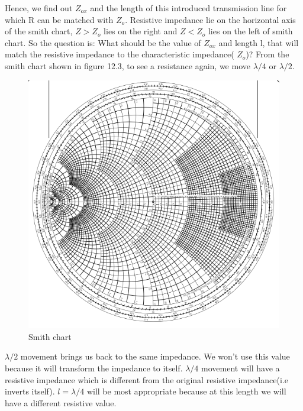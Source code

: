 Hence, we find out $ Z_{ox}$ and the length of this introduced transmission line for which R can be matched with $ Z_o$. Resistive impedance lie on the horizontal axis of the smith chart, $Z >  Z_o$ lies on the right and $Z <  Z_o$ lies on the left of smith chart.
So the question is: What should be the value of $Z_{ox}$ and length l, that will match the resistive impedance to the characteristic impedance( $Z_o$)? From the smith chart shown in figure 12.3, to see a resistance again, we move $ \lambda/4$  or $ \lambda/2$. %
\begin{figure}[h]
\centering
\includegraphics[width=1\linewidth]{./graphics/smich}
\caption{Smith chart}
\end{figure}
$\lambda/2$ movement brings us back to the same impedance. We won't use this value because it will transform the impedance to itself. $\lambda/4$ movement will have a resistive impedance which is different from the original resistive impedance(i.e inverts itself). $l = \lambda/4 $ will be most appropriate because at this length we will have a different resistive value.\\%
